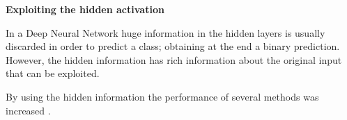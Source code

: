 \begin{mybox}
\textbf{Exploiting the hidden activation}

In a Deep Neural Network huge information in the hidden layers is usually
discarded in order to predict a class; obtaining at the end a binary
prediction. However, the hidden information has rich information about the
original input that can be exploited.
\end{mybox}

By using the hidden information the performance of several methods was
increased \cite{gu2016learning}.


